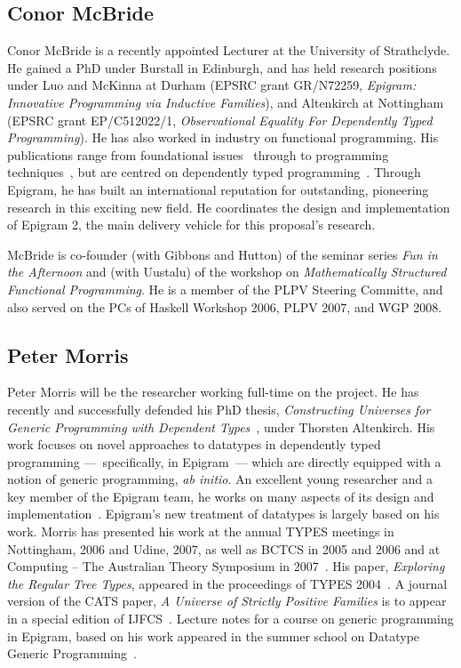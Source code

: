 \documentclass[a4paper]{article}
\begin{document}
\subsection*{Conor McBride}
Conor McBride is a recently appointed Lecturer at the University of
Strathclyde. He gained a PhD under Burstall in Edinburgh, and has held
research positions under Luo and McKinna at Durham (EPSRC grant
GR/N72259, \emph{Epigram: Innovative Programming via Inductive
  Families}), and Altenkirch at Nottingham (EPSRC grant EP/C512022/1,
\emph{Observational Equality For Dependently Typed Programming}). He
has also worked in industry on functional programming.  His
publications range from foundational
issues~\cite{alti:jpartial,alti:mpc04,alti:tlca03,%
  DBLP:conf/birthday/GoguenMM06} through to programming
techniques~\cite{conor.james:notanumber,%
  conor.ross:applicative.functors,conor:faking,
  DBLP:conf/popl/McBride08}, but are centred on dependently typed
programming~\cite{conor.james:viewfromleft,
  conor:unification,conor:afp-notes,alti:wcgp02,
  alti:regular}. Through Epigram, he has built an international
reputation for outstanding, pioneering research in this exciting new
field. He coordinates the design and implementation of Epigram 2, the
main delivery vehicle for this proposal's research.

McBride is co-founder (with Gibbons and Hutton) of the seminar series
\emph{Fun in the Afternoon} and (with Uustalu) of the workshop on
\emph{Mathematically Structured Functional Programming}.  He is a
member of the PLPV Steering Committe, and also served on the PCs of
Haskell Workshop 2006, PLPV 2007, and WGP 2008.


\subsection*{Peter Morris}

Peter Morris will be the researcher working full-time on the project.
He has recently and successfully defended his PhD thesis, \emph{Constructing
Universes for Generic Programming with Dependent Types}~\cite{morris:PhD},
under Thorsten Altenkirch. His work focuses on novel approaches to datatypes
in dependently typed programming ---~specifically, in Epigram~--- which are
directly equipped with a notion of generic programming, \emph{ab initio}.  
An excellent young researcher and a 
key member of the Epigram team, he works on
many aspects of its design and implementation~\cite{epigram2}. Epigram's new
treatment of datatypes is largely based on his work.  Morris has presented
his work at the annual TYPES meetings in Nottingham, 2006 and Udine, 2007, as
well as BCTCS in 2005 and 2006 and at Computing -- The Australian Theory
Symposium in 2007~\cite{alti:cats07}.  His paper, \emph{Exploring the Regular
Tree Types}, appeared in the proceedings of TYPES 2004~\cite{alti:regular}. A
journal version of the CATS paper, \emph{A Universe of Strictly Positive
Families} is to appear in a special edition of IJFCS~\cite{alti:jcats07}.
Lecture notes for a course on generic programming in Epigram, based on his
work appeared in the summer school on Datatype Generic
Programming~\cite{txa:ssgp06}.
\end{document}
